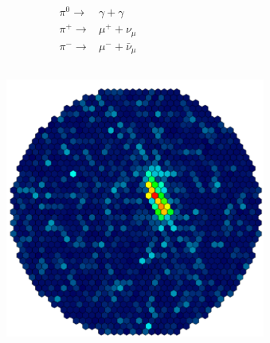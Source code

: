 \documentclass[aspectratio=1610, professionalfonts, 9pt]{beamer}
\begin{document}
\begin{frame}
\begin{columns}[onlytextwidth]
\begin{figure}
	  \cite{corsika}
	\end{figure}
	\begin{eqnarray*}
	  \pi^{0} \rightarrow& \gamma + \gamma \\
	  \pi^{+} \rightarrow& \mu^{+} + \nu_{\mu} \\
	  \pi^{-} \rightarrow& \mu^{-} + \bar{\nu}_{\mu}
	\end{eqnarray*}
  \end{columns}
\end{frame}

\begin{frame}
  \begin{columns}[onlytextwidth]
	\begin{figure}
	  \centering
	  \includegraphics[height=0.8\textheight]{./images/Gamma.pdf}
	\end{figure}
	\begin{figure}
	  \centering

\end{figure}
\end{columns}
\end{frame}
\end{document}
